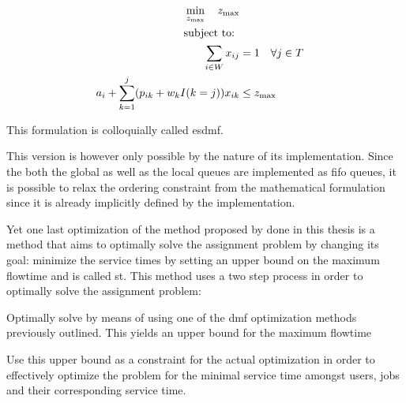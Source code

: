\documentclass[draft=false]{seal_thesis}
\begin{document}
\begin{align}
    \min_{z_{\text{max}}} \quad z_{\text{max}}\\
    \text{subject to: } \notag \\
    \sum_{i \in W} x_{ij} &= 1 \quad \forall j \in T\\
    a_i + \sum_{k=1}^j (p_{ik} + w_k I(k=j))x_{ik} &\leq z_{\text{max}}
\end{align}

This formulation is colloquially called \gls{esdmf}.

This version is however only possible by the nature of its implementation. Since the both the global as well as the local queues are implemented as \gls{fifo} queues, it is possible to relax the ordering constraint from the mathematical formulation since it is already implicitly defined by the implementation.

Yet one last optimization of the method proposed by \citet{Zeng2005} done in this thesis is a method that aims to optimally solve the assignment problem by changing its goal: minimize the service times by setting an upper bound on the maximum flowtime and is called \gls{st}. This method uses a two step process in order to optimally solve the assignment problem:
\begin{enumerate*}
	\item Optimally solve by means of using one of the \gls{dmf} optimization methods previously outlined. This yields an upper bound for the maximum flowtime
	\item Use this upper bound as a constraint for the actual optimization in order to effectively optimize the problem for the minimal service time amongst users, jobs and their corresponding service time.
\end{enumerate*}
\end{document}

